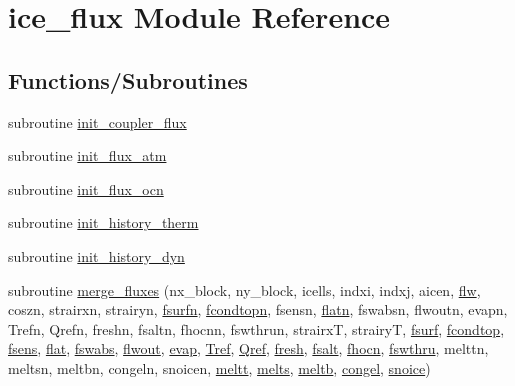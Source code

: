\hypertarget{namespaceice__flux}{
\section{ice\_\-flux Module Reference}
\label{namespaceice__flux}
}
\subsection*{Functions/Subroutines}
\begin{DoxyCompactItemize}
\item 
subroutine \hyperlink{namespaceice__flux_ac74f9f7368cb2f65428e77204441ef67}{init\_\-coupler\_\-flux}
\item 
subroutine \hyperlink{namespaceice__flux_aa03a1e25e4227bda9639c5a178891acd}{init\_\-flux\_\-atm}
\item 
subroutine \hyperlink{namespaceice__flux_a985af4afe9ebb697857f3f5eaf714545}{init\_\-flux\_\-ocn}
\item 
subroutine \hyperlink{namespaceice__flux_a510c385b0536089d8f4a00ff9c3701cb}{init\_\-history\_\-therm}
\item 
subroutine \hyperlink{namespaceice__flux_adf87450fd972c99fd3d0d4514df29fa9}{init\_\-history\_\-dyn}
\item 
subroutine \hyperlink{namespaceice__flux_aef9c3629a862eb2f134c9aa6b7935acc}{merge\_\-fluxes} (nx\_\-block, ny\_\-block, icells, indxi, indxj, aicen, \hyperlink{namespaceice__flux_a5a996f0c777a83d0532daa407dae18e5}{flw}, coszn, strairxn, strairyn, \hyperlink{namespaceice__flux_aa05e0fe10c9628c94efe017d79f0cd1e}{fsurfn}, \hyperlink{namespaceice__flux_a0f22ed9bcb531d5ea26305f27ed19d05}{fcondtopn}, fsensn, \hyperlink{namespaceice__flux_a43363f554cd27a966c89394ce573135e}{flatn}, fswabsn, flwoutn, evapn, Trefn, Qrefn, freshn, fsaltn, fhocnn, fswthrun, strairxT, strairyT, \hyperlink{namespaceice__flux_a27dbd3d1fc36c0ddb4c39c806d935775}{fsurf}, \hyperlink{namespaceice__flux_a0ba73c84e3792cf8704a33f6d95e7f95}{fcondtop}, \hyperlink{namespaceice__flux_ad76df6df986573fcb622fb418d960f37}{fsens}, \hyperlink{namespaceice__flux_ab2d967d4946f473fc077416bdd6cd13f}{flat}, \hyperlink{namespaceice__flux_af3384816a4840e4df4c79f158e6e9762}{fswabs}, \hyperlink{namespaceice__flux_a1ec39d9db775aa2496c0c0ad3ab9c8e4}{flwout}, \hyperlink{namespaceice__flux_abfe856f2125b879db70ba8a8a43aaefd}{evap}, \hyperlink{namespaceice__flux_a6a0b5fa95bab43f29f8cbd6cbd8f047f}{Tref}, \hyperlink{namespaceice__flux_ac332e72481b7da42322f9e2581f09434}{Qref}, \hyperlink{namespaceice__flux_adbdb875a7e468b890dba7204d972c05a}{fresh}, \hyperlink{namespaceice__flux_a93da98d35da9e23e802edb93bcaf7477}{fsalt}, \hyperlink{namespaceice__flux_ad13e4555d29196de5e5e1130432c5a3a}{fhocn}, \hyperlink{namespaceice__flux_a2b935c4127f16509133036f6cf544794}{fswthru}, melttn, meltsn, meltbn, congeln, snoicen, \hyperlink{namespaceice__flux_aa99daffd05f84f37a6036ce5901100af}{meltt}, \hyperlink{namespaceice__flux_aae0e112fe38b436d979dc7fe86cdcb8f}{melts}, \hyperlink{namespaceice__flux_acdba57f616cfb780f910b8214a5b6121}{meltb}, \hyperlink{namespaceice__flux_acb44c9e01061e258c35b8dbadf412741}{congel}, \hyperlink{namespaceice__flux_a081cc6f264496624fb6bce9e69e74d9c}{snoice})

\end{DoxyCompactItemize}
